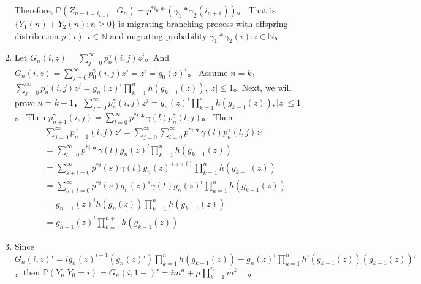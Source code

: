 \documentclass{ctexart}
\begin{document}
\begin{enumerate}
\[    \]
    Therefore, \(\mathbb{P}(Z_{n + 1=i_{n + 1}} \mid G_n)=p^{* i_n}*(\gamma_1 * \gamma_2(i_{n + 1}))\)\nolinebreak[4]。
    That is \(\{Y_1(n )+ Y_2(n): n \geq 0\}\) is migrating branching process with offspring distribution \(p(i): i \in \mathbb{N}\)
    and migrating probability \(\gamma_1 * \gamma_2(i): i \in \mathbb{N}\)\nolinebreak[4]。
  \item Let \(G_n(i,z)=\sum_{j=0}^{\infty} p_n^\gamma(i,j)z^j\)\nolinebreak[4]。And \(G_n(i,z)=\sum_{j=0}^{\infty} p_0^\gamma(i,j)z^j=z^i=g_0(z)^i\)\nolinebreak[4]。
    Assume \(n=k\)\nolinebreak[4]，\(        \sum_{j=0}^{\infty} p_n^\gamma(i,j)z^j = g_n(z)^i \prod_{k=1}^{n} h(g_{k-1}(z)), |z| \leq 1\)\nolinebreak[4]。Next, we will
    prove \(n=k + 1\)\nolinebreak[4]，\(        \sum_{j=0}^{\infty} p_n^\gamma(i,j)z^j = g_n(z)^i \prod_{k=1}^{n} h(g_{k-1}(z)), |z| \leq 1\)\nolinebreak[4]。
    Then \(p_{n + 1}^\gamma(i,j)=\sum_{l=0}^{\infty} p^{*i}*\gamma(l)p_n^\gamma(l,j)\)\nolinebreak[4]。
    Then \[
      \begin{aligned}
        & \sum_{j=0}^{\infty} p_{n + 1}^\gamma(i,j)z^j = \sum_{j=0}^{\infty} \sum_{l=0}^{\infty} p^{*i}*\gamma(l)p_n^{\gamma}(l,j)z^j
        \\              & =\sum_{l=0}^{\infty} p^{*i}*\gamma(l)g_n(z)^l \prod_{k=1}^{n} h(g_{k-1}(z))
        \\              & =\sum_{s+t=0}^{\infty} p^{*i}(s)\gamma(t)g_n(z)^{(s + t)} \prod_{k=1}^{n} h(g_{k-1}(z))
        \\              & =\sum_{s+t=0}^{\infty} p^{*i}(s)g_n(z)^{s}\gamma(t)g_n(z)^t \prod_{k=1}^{n} h(g_{k-1}(z))
        \\              & =g_{n + 1}(z)^{i}h(g_n(z)) \prod_{k=1}^{n} h(g_{k-1}(z))
        \\&        =g_{n + 1}(z)^{i}\prod_{k=1}^{n + 1} h(g_{k-1}(z))
      \end{aligned}
    \]
  \item Since \(G_n(i,z)'=ig_n(z)^{i-1}(g_n(z)')\prod_{k=1}^{n}h(g_{k -1}(z)) + g_n(z)^i \prod_{k=1}^{n} h'(g_{k-1}(z))(g_{k-1}(z))' \)\nolinebreak[4]，then
    \(\mathbb{P}(Y_n|Y_0=i)=G_n(i,1-)'=im^n + \mu \prod_{k=1}^{n} m^{k -1}\)\nolinebreak[4]。
\end{enumerate}
\end{document}
